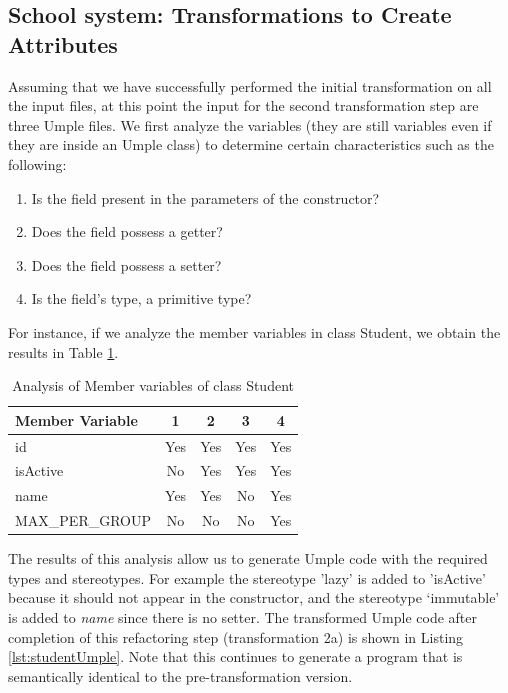 \subsection{School system: Transformations to Create Attributes}

Assuming that we have successfully performed the initial transformation on all the input files, at this point the input for the second transformation step are three Umple files.
We first analyze the variables (they are still variables even if they are inside an Umple class) to determine certain characteristics such as the following:

\begin{enumerate}
\item Is the field present in the parameters of the constructor?
\item Does the field possess a getter?
\item Does the field possess a setter?
\item Is the field's type, a primitive type?
\end{enumerate}

For instance, if we analyze the member variables in class Student, we obtain the results in Table \ref{table:analysisStudent}.

\begin{table}[ht]
\caption{Analysis of Member variables of class Student}
\label{table:analysisStudent}
\centering
\begin{tabular}{l|cccc}
\toprule
\rowcolor[HTML]{BBDAFF}
\textbf{Member Variable} & \textbf{1}  & \textbf{2}   & \textbf{3}   & \textbf{4}    \\ \hline
id & Yes &  Yes &  Yes &  Yes \\ 
isActive &  No &  Yes &  Yes &  Yes \\ 
name &  Yes &  Yes &  No &  Yes \\ 
MAX\_PER\_GROUP &  No &  No &  No &  Yes \\ 
\hline
\end{tabular}
\end{table}


The results of this analysis allow us to generate Umple code with the required types and stereotypes. For example the stereotype 'lazy' is added to 'isActive' because it should not appear in the constructor, and the stereotype `immutable' is added to \textit{name} since there is no setter. The transformed Umple code after completion of this refactoring step (transformation 2a) is shown in Listing \ref{lst:studentUmple}. Note that this continues to generate a program that is semantically identical to the pre-transformation version.

